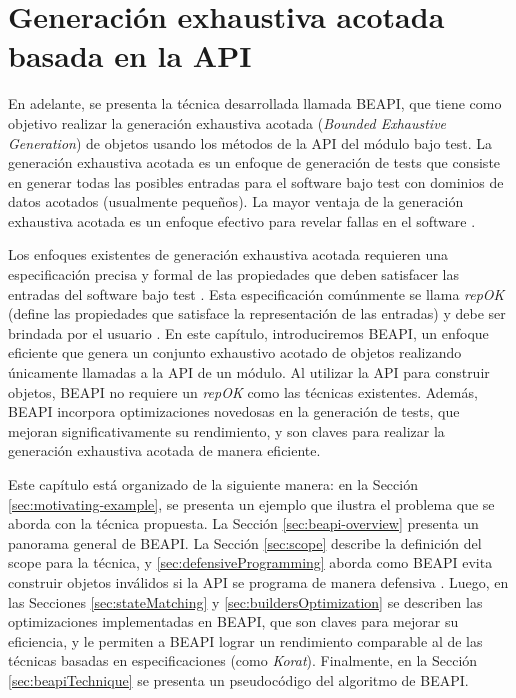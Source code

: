 \chapter{Generación exhaustiva acotada basada en la API}
\label{cap:beapi}

En adelante, se presenta la técnica desarrollada llamada BEAPI, que tiene como
objetivo realizar la generación exhaustiva acotada (\emph{Bounded Exhaustive Generation}) 
de objetos usando los métodos de la API del módulo bajo test. 
La generación exhaustiva acotada es un enfoque de generación de tests que
consiste en generar todas las posibles entradas para el software bajo test con
dominios de datos acotados (usualmente pequeños). 
La mayor ventaja de la generación exhaustiva acotada es un enfoque efectivo para
revelar fallas en el software \cite{Marinov01,Khurshid01,Boyapati02,Sullivan04}.

Los enfoques existentes de generación exhaustiva acotada requieren una
especificación precisa y formal de las propiedades que deben satisfacer las
entradas del software bajo test \cite{Boyapati02,KhKhurshid01,Ponzio16Ponzio:2016,Rosner14}. 
Esta especificación comúnmente se llama \emph{repOK} (define las propiedades que
satisface la representación de las entradas) y debe ser brindada por el usuario \cite{Boyapati02,Khurshid01,Ponzio16Ponzio:2016,Rosner14}.
En este capítulo, introduciremos BEAPI, un enfoque eficiente que genera un
conjunto exhaustivo acotado de objetos realizando únicamente llamadas a la API
de un módulo. Al utilizar la API para construir objetos, BEAPI no requiere 
un \emph{repOK} como las técnicas existentes. 
Además, BEAPI incorpora optimizaciones novedosas en la generación de tests, que
mejoran significativamente su rendimiento, y son claves para realizar la generación exhaustiva acotada de manera eficiente. 

Este capítulo está organizado de la siguiente manera: en la Sección \ref{sec:motivating-example}, 
se presenta un ejemplo que ilustra el problema que se aborda con la técnica propuesta. 
La Sección \ref{sec:beapi-overview} presenta un panorama general de 
BEAPI. La Sección \ref{sec:scope} describe la definición del scope para la
técnica, y \ref{sec:defensiveProgramming} aborda como BEAPI evita construir
objetos inválidos si la API se programa de manera defensiva \cite{Liskov00}.
Luego, en las Secciones \ref{sec:stateMatching} y
 \ref{sec:buildersOptimization} se describen las optimizaciones implementadas en
 BEAPI, que son claves para mejorar su eficiencia, y le permiten a BEAPI 
lograr un rendimiento comparable al de las técnicas basadas en especificaciones
(como \emph{Korat}\cite{Boyapati02}). Finalmente, en la Sección 
\ref{sec:beapiTechnique} se presenta un pseudocódigo del algoritmo de BEAPI.


